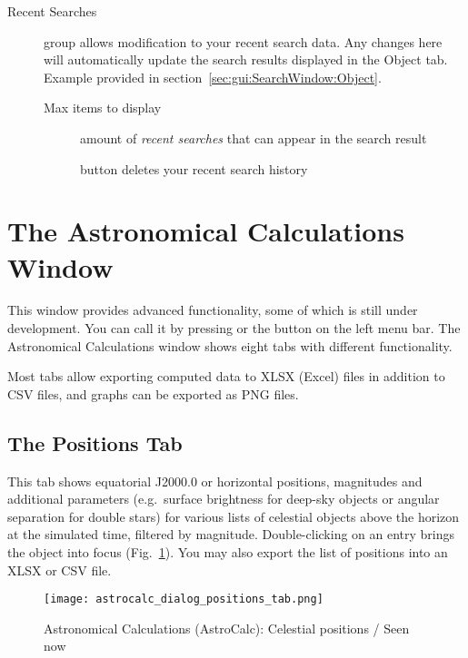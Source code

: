 \begin{description}
\item[Recent Searches]group allows modification to your recent search data. 
Any changes here will automatically update the search results displayed in the Object tab. 
Example provided in section~\ref{sec:gui:SearchWindow:Object}.
\begin{description}
\item[Max items to display] amount of \emph{recent searches} that can appear in the search result
\item[] button deletes your recent search history
\end{description}
\end{description}

\section{The Astronomical Calculations Window}
\label{sec:gui:AstroCalc}

This window  provides advanced functionality, some of which is still under development.
You can call it by pressing  or the button  on the left menu bar. 
The Astronomical Calculations window shows eight tabs with different functionality.

Most tabs allow  exporting computed data to XLSX (Excel) files in addition to CSV files, and
graphs can be exported  as PNG files.

\subsection{The Positions Tab}
\label{sec:gui:AstroCalc:Positions}

This tab  shows equatorial J2000.0 or horizontal positions, magnitudes and additional parameters 
(e.g.\ surface brightness for deep-sky objects or angular separation for double stars) for various 
lists of celestial objects above the horizon at the simulated time, filtered by magnitude. 
Double-clicking on an entry brings the object into focus (Fig.~\ref{fig:gui:AstroCalc:Positions}). 
You may also export the list of positions into an XLSX or CSV file.

\begin{figure}[htbp]
	\centering\texttt{[image: astrocalc\_dialog\_positions\_tab.png]}
	\caption{Astronomical Calculations (AstroCalc): Celestial positions / Seen now}
	\label{fig:gui:AstroCalc:Positions}
\end{figure}

